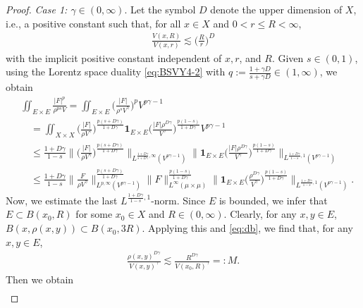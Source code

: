 \documentclass[11pt]{amsart}
\theoremstyle{definition}
\theoremstyle{remark}
\numberwithin{equation}{section}
\newcommand{\Norm}[2]{\|#1\|_{#2}}
\newcommand{\BNorm}[2]{\Big\|#1\Big\|_{#2}}
\begin{document}
\begin{proof}
\emph{Case 1: $\gamma\in(0,\infty)$}. Let the symbol $D$ denote the upper dimension
of $X$, i.e., a positive constant such that, for all $x\in X$ and $0<r\le R<\infty$,
\begin{align}\label{eq:db}
\frac{V(x,R)}{V(x,r)}\lesssim \Big(\frac{R}{r}\Big)^D
\end{align}
with the implicit positive constant independent of $x,r$, and $R$.
Given $s\in(0,1)$, using the Lorentz space duality \eqref{eq:BSVY4-2} with $q:=
\frac{1+\gamma D}{s+\gamma D}\in (1,\infty)$, we obtain
\begin{equation}\label{eq:BSVY-v2}
\begin{split}
&\iint_{E\times E}\frac{|F|^p}{\rho^{ps}V}%
=\iint_{E\times E}\Big(\frac{|F|}{\rho^{s}V^\gamma}\Big)^pV^{p\gamma-1}    \\
&\quad=\iint_{X\times X}\Big(\frac{|F|}{\rho V^\gamma}\Big)^{\frac{p(s+D\gamma)}{1+D\gamma}}
\mathbf{1}_{E\times E}\Big(\frac{|F|
\rho^{D\gamma}}{V^\gamma}\Big)^{\frac{p(1-s)}{1+D\gamma}}
V^{p\gamma-1}\\
&\quad\le \frac{1+D\gamma}{1-s}
\BNorm{\Big(\frac{|F|}{\rho V^\gamma}\Big)^{\frac{p(s+D\gamma)}{1+D\gamma}}}{
L^{\frac{1+D\gamma}{s+D\gamma},\infty} (V^{p\gamma-1})} %
\BNorm{\mathbf{1}_{E\times E}\Big(\frac{|F|
\rho^{D\gamma}}{V^\gamma}\Big)^{\frac{p(1-s)}{1+D\gamma}}}{
L^{\frac{1+D\gamma}{1-s},1} (V^{p\gamma-1})}\\
&\quad\le \frac{1+D\gamma}{1-s}
\BNorm{\frac{F}{\rho V^\gamma}}{
L^{p,\infty}
(V^{p\gamma-1})}^{\frac{p(s+D\gamma)}{1+D\gamma}}\Norm{F}{L^\infty(\mu\times\mu)}
^{\frac{p(1-s)}{1+D\gamma}} %
\BNorm{\mathbf{1}_{E\times
E}\Big(\frac{\rho^{D\gamma}}{V^\gamma}\Big)^{\frac{p(1-s)}{1+D\gamma}}}{
L^{\frac{1+D\gamma}{1-s},1} (V^{p\gamma-1})}.
\end{split}
\end{equation}
Now, we estimate the last $L^{\frac{1+D\gamma}{1-s},1}$-norm.
Since $E$ is bounded, we infer that $E\subset B(x_0,R)$ for some $x_0\in X$
and $R\in(0,\infty)$. Clearly, for any $x,y\in E$, $B(x,\rho(x,y))\subset
B(x_0,3R)$. Applying this and \eqref{eq:db}, we find that, for any $x,y\in E$,
\begin{align}\label{eq:pvm}
\frac{\rho(x,y)^{D\gamma}}{V(x,y)^\gamma}\lesssim
\frac{R^{D\gamma}}{V(x_0,R)^\gamma}=:M.
\end{align}
Then we obtain
\begin{equation}\label{eq:lot1}
\begin{split}

\end{split}
\end{equation}
\end{proof}
\end{document}
